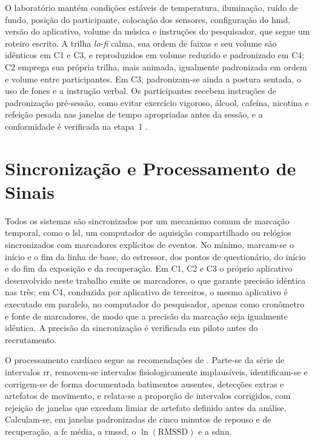 O laboratório mantém condições estáveis de temperatura, iluminação, ruído de fundo, posição do participante, colocação dos sensores, configuração do \gls{hmd}, versão do aplicativo, volume da música e instruções do pesquisador, que segue um roteiro escrito. A trilha \textit{lo-fi} calma, sua ordem de faixas e seu volume são idênticos em C1 e C3, e reproduzidos em volume reduzido e padronizado em C4; C2 emprega sua própria trilha, mais animada, igualmente padronizada em ordem e volume entre participantes. Em C3, padronizam-se ainda a postura sentada, o uso de fones e a instrução verbal. Os participantes recebem instruções de padronização pré-sessão, como evitar exercício vigoroso, álcool, cafeína, nicotina e refeição pesada nas janelas de tempo apropriadas antes da sessão, e a conformidade é verificada na etapa~1 \citep{Laborde2017}.

\section{Sincronização e Processamento de Sinais}\label{sec:processamento}

Todos os sistemas são sincronizados por um mecanismo comum de marcação temporal, como o \gls{lsl}, um computador de aquisição compartilhado ou relógios sincronizados com marcadores explícitos de eventos. No mínimo, marcam-se o início e o fim da linha de base, do estressor, dos pontos de questionário, do início e do fim da exposição e da recuperação. Em C1, C2 e C3 o próprio aplicativo desenvolvido neste trabalho emite os marcadores, o que garante precisão idêntica nas três; em C4, conduzida por aplicativo de terceiros, o mesmo aplicativo é executado em paralelo, no computador do pesquisador, apenas como cronômetro e fonte de marcadores, de modo que a precisão da marcação seja igualmente idêntica. A precisão da sincronização é verificada em piloto antes do recrutamento.

O processamento cardíaco segue as recomendações de \citet{Laborde2017}. Parte-se da série de intervalos \gls{rr}, removem-se intervalos fisiologicamente implausíveis, identificam-se e corrigem-se de forma documentada batimentos ausentes, detecções extras e artefatos de movimento, e relata-se a proporção de intervalos corrigidos, com rejeição de janelas que excedam limiar de artefato definido antes da análise. Calculam-se, em janelas padronizadas de cinco minutos de repouso e de recuperação, a \gls{fc} média, a \gls{rmssd}, o $\ln(\mathrm{RMSSD})$ e a \gls{sdnn}.

